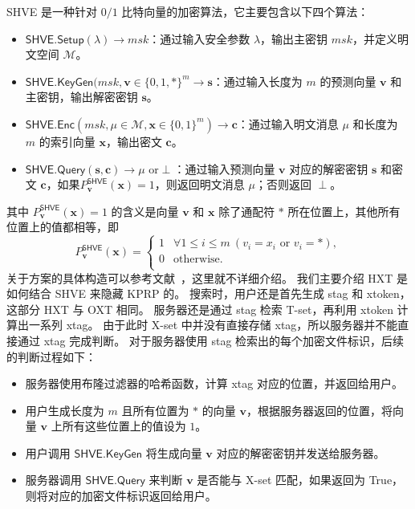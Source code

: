 SHVE 是一种针对 $0/1$ 比特向量的加密算法，它主要包含以下四个算法：
\begin{itemize}
  \item $\mathsf{SHVE}.\mathsf{Setup}(\lambda) \to msk$：通过输入安全参数 $\lambda$，输出主密钥 $msk$，并定义明文空间 $\mathcal{M}$。
  \item $\mathsf{SHVE}.\mathsf{KeyGen}(msk, \mathbf{v} \in \{0,1,*\}^m \to \mathbf{s} $：通过输入长度为 $m$ 的预测向量 $\mathbf{v}$ 和主密钥，输出解密密钥 $\mathbf{s}$。
  \item $\mathsf{SHVE}.\mathsf{Enc}(msk, \mu\in \mathcal{M}, \mathbf{x} \in \{0,1\}^m ) \to \mathbf{c}$：通过输入明文消息 $\mu$ 和长度为 $m$ 的索引向量 $\mathbf{x}$，输出密文 $\mathbf{c}$。
  \item $\mathsf{SHVE}.\mathsf{Query}(\mathbf{s}, \mathbf{c}) \to \mu \mbox{ or} \perp$：通过输入预测向量 $\mathbf{v}$ 对应的解密密钥 $\mathbf{s}$ 和密文 $\mathbf{c}$，如果$P_{\mathbf{v}}^{\mathsf{SHVE}}(\mathbf{x}) = 1$，则返回明文消息 $\mu$；否则返回 $\perp$。
\end{itemize}
其中 $P_{\mathbf{v}}^{\mathsf{SHVE}}(\mathbf{x})=1$ 的含义是向量 $\mathbf{v}$ 和 $\mathbf{x}$ 除了通配符 $*$ 所在位置上，其他所有位置上的值都相等，即
\begin{equation}
  P_{\mathbf{v}}^{\mathsf{SHVE}}(\mathbf{x}) = \left\{
  \begin{array}{ll}
  1 & \forall 1\leq i \leq m \  (v_i = x_i \mbox{ or } v_i=*), \\
  0 & \mbox{otherwise}. \\
  \end{array}
  \right.
\end{equation}
关于方案的具体构造可以参考文献~\cite{lai2018result}，这里就不详细介绍。
我们主要介绍 HXT 是如何结合 SHVE 来隐藏 KPRP 的。
搜索时，用户还是首先生成 stag 和 xtoken，这部分 HXT 与 OXT 相同。
服务器还是通过 stag 检索 T-set，再利用 xtoken 计算出一系列 xtag。
由于此时 X-set 中并没有直接存储 xtag，所以服务器并不能直接通过 xtag 完成判断。
对于服务器使用 stag 检索出的每个加密文件标识，后续的判断过程如下：
\begin{itemize}
  \item 服务器使用布隆过滤器的哈希函数，计算 xtag 对应的位置，并返回给用户。
  \item 用户生成长度为 $m$ 且所有位置为 $*$ 的向量 $\mathbf{v}$，根据服务器返回的位置，将向量 $\mathbf{v}$ 上所有这些位置上的值设为 $1$。
  \item 用户调用 $\mathsf{SHVE}.\mathsf{KeyGen}$ 将生成向量 $\mathbf{v}$ 对应的解密密钥并发送给服务器。
  \item 服务器调用 $\mathsf{SHVE}.\mathsf{Query}$ 来判断 $\mathbf{v}$ 是否能与 X-set 匹配，如果返回为 True，则将对应的加密文件标识返回给用户。
\end{itemize}

